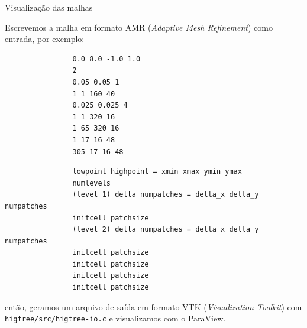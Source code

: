 \documentclass[../main/main.tex]{subfiles}
\begin{document}
\begin{frame}[fragile]{\smaller \smaller Visualização das malhas}
	
	\smaller
	Escrevemos a malha em formato AMR (\textit{Adaptive Mesh Refinement}) como entrada, por exemplo:
	
	{\scriptsize
		\begin{minipage}{0.15\textwidth}
			\begin{verbatim}
				0.0 8.0 -1.0 1.0
				2
				0.05 0.05 1
				1 1 160 40
				0.025 0.025 4
				1 1 320 16
				1 65 320 16
				1 17 16 48
				305 17 16 48
			\end{verbatim}
		\end{minipage}
		\hfill
		\begin{minipage}{0.75\textwidth}
			\begin{verbatim}
				lowpoint highpoint = xmin xmax ymin ymax
				numlevels
				(level 1) delta numpatches = delta_x delta_y numpatches
				initcell patchsize
				(level 2) delta numpatches = delta_x delta_y numpatches
				initcell patchsize
				initcell patchsize
				initcell patchsize
				initcell patchsize
			\end{verbatim}
		\end{minipage}
	}
	
	então, geramos um arquivo de saída em formato VTK (\textit{Visualization Toolkit}) com \texttt{higtree/src/higtree-io.c} e visualizamos com o ParaView.
\end{frame}
\end{document}
